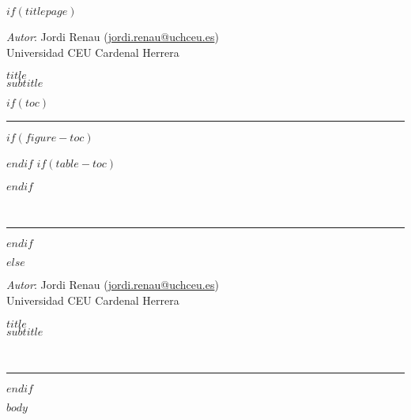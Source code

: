 \documentclass[11pt,a4paper,twoside,onecolumn,notitlepage,final]{scrartcl}
\date{$date$}
\newcommand{\mititulo}{ $title$ }
\newcommand{\misubtitulo}{ $subtitle$ }
\begin{document}
	\renewcommand{\tablename}{Tabla}
	
	$if(titlepage)$
	\begin{titlepage}
		
		\begin{flushright}
			\large
			\textit{Autor}: Jordi Renau (\href{mailto:jordi.renau@uchceu.es}{jordi.renau@uchceu.es}) \\
			Universidad CEU Cardenal Herrera %
		
	
		\Huge 
		\mititulo \\[0.5cm]
		\huge
		\misubtitulo \\[1.5cm]
	\end{flushright}
	$if(toc)$
	\hrule
	\renewcommand{\contentsname}{Contenidos \small (\textit{Actualizado}: \today)}
	
	\tableofcontents 
	$if(figure-toc)$
	\renewcommand{\listfigurename}{Lista de figuras}
	\listoffigures
	$endif$
	$if(table-toc)$
	\renewcommand{\listtablename}{Lista de tablas}
	\listoftables
	$endif$
	
	~
	
	\hrule
	$endif$
\end{titlepage}
$else$
		\begin{flushright}
			\thispagestyle{empty}
	\large
	\textit{Autor}: Jordi Renau (\href{mailto:jordi.renau@uchceu.es}{jordi.renau@uchceu.es}) \\
	Universidad CEU Cardenal Herrera %

	\Huge 
	\mititulo \\[0.5cm]
	\huge
	\misubtitulo \\[0.5cm]

\end{flushright}
		~

\hrule
$endif$




$body$
\end{document}
